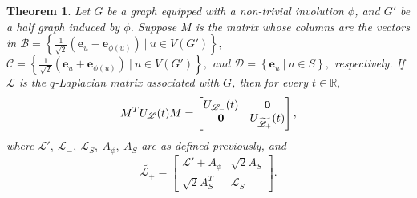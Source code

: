 \documentclass[12pt,a4paper]{article}
\newtheorem{thm}{Theorem}
\def \e {{\mathbf e}}
\def \o {{\bf 0}}
\newcommand{\ob}[1]{\left(#1\right)}
\newcommand{\cb}[1]{\left\lbrace #1\right\rbrace}
\begin{document}
\begin{thm}\label{T2}
Let $G$ be a graph equipped with a non-trivial involution $\phi$, and $G'$ be a half graph induced by $\phi$. Suppose $M$ is the matrix whose columns are the vectors in $\mathcal{B}= \cb{\frac{1}{\sqrt{2} }\ob{\e_u-\e_{\phi(u)} }~|~  u \in V(G')},$ $\mathcal{C}=\cb{\frac{1}{\sqrt{2} }\ob{\e_u+\e_{\phi(u)} }~|~ u \in V(G')},$ and $\mathcal{D}=\cb{\e_u~|~ u \in S},$ respectively. If $\mathscr{L}$ is the $q$-Laplacian matrix associated with $G$, then for every $t \in \mathbb{R},$
\[M^T U_\mathscr{L}(t) M= \begin{bmatrix}	U_{\mathscr{L}_-}(t) & \o\\	\o & U_{\widetilde{\mathscr{L}_+}}(t)
\end{bmatrix},\]
where $\mathscr{L}',~\mathscr{L}_{-},~\mathscr{L}_{S}, ~A_\phi, ~A_S$ are as defined previously, and
\[\widetilde{\mathscr{L}_+}=\begin{bmatrix}	\mathscr{L}'+A_\phi&\sqrt{2} A_S\\
\sqrt{2}A_S^T & \mathscr{L}_S
\end{bmatrix}.\]
\end{thm}
\end{document}
